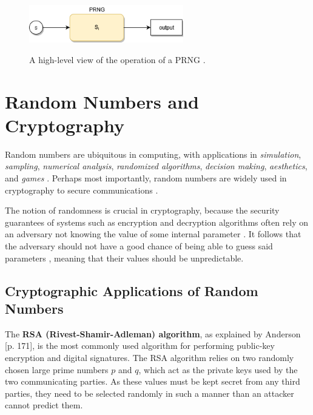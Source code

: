 \documentclass[12pt, titlepage]{report}
\theoremstyle{definition}
\begin{document}
\begin{figure}
\centering
\includegraphics[width=0.6\textwidth]{img/conceptual_prng.png}\\
\caption{A high-level view of the operation of a PRNG \cite{kelsey1998cryptanalytic}.}
\label{figure:prng_high_level}
\end{figure}



\section{Random Numbers and Cryptography}
Random numbers are ubiquitous in computing, with applications in \emph{simulation}, \emph{sampling}, \emph{numerical analysis}, \emph{randomized algorithms}, \emph{decision making}, \emph{aesthetics}, and \emph{games} \cite[p. 1-2]{donald1998art}. Perhaps most importantly, random numbers are widely used in cryptography to secure communications \cite[p. 137]{ferguson2010cryptography}.

The notion of randomness is crucial in cryptography, because the security guarantees of systems such as encryption and decryption algorithms often rely on an adversary not knowing the value of some internal parameter \cite[p. 169]{menezes1996handbook} \cite[p. 1]{kelsey1998cryptanalytic}. It follows that the adversary should not have a good chance of being able to guess said parameters \cite[p. 2]{kelsey1998cryptanalytic}, meaning that their values should be unpredictable.


\subsection{Cryptographic Applications of Random Numbers}

The \textbf{RSA (Rivest-Shamir-Adleman) algorithm}, as explained by Anderson [p. 171]\cite{anderson2010security}, is the most commonly used algorithm for performing public-key encryption and digital signatures. The RSA algorithm relies on two randomly chosen large prime numbers $p$ and $q$, which act as the private keys used by the two communicating parties. As these values must be kept secret from any third parties, they need to be selected randomly in such a manner than an attacker cannot predict them.
\end{document}
